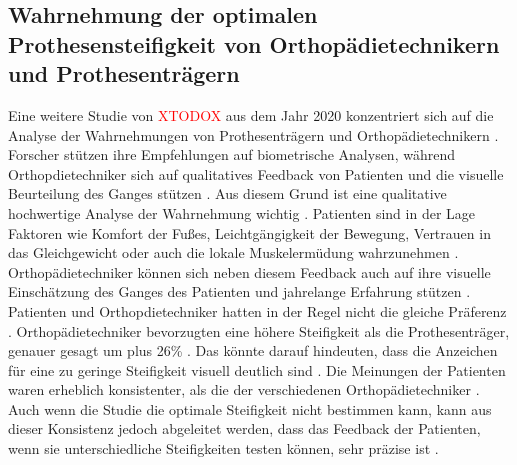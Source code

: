 \subsection{Wahrnehmung der optimalen Prothesensteifigkeit von Orthopädietechnikern und Prothesenträgern}
Eine weitere Studie von \textcolor{red}{XTODOX} aus dem Jahr 2020 konzentriert sich auf die Analyse der Wahrnehmungen von Prothesenträgern und Orthopädietechnikern \cite{Shepherd.2020}. Forscher stützen ihre Empfehlungen auf biometrische Analysen, während Orthopdietechniker sich auf qualitatives Feedback von Patienten und die visuelle Beurteilung des Ganges stützen \cite{Shepherd.2020}. Aus diesem Grund ist eine qualitative hochwertige Analyse der Wahrnehmung wichtig \cite{Shepherd.2020}. Patienten sind in der Lage Faktoren wie Komfort der Fußes, Leichtgängigkeit der Bewegung, Vertrauen in das Gleichgewicht oder auch die lokale Muskelermüdung wahrzunehmen \cite{Shepherd.2020}. Orthopädietechniker können sich neben diesem Feedback auch auf ihre visuelle Einschätzung des Ganges des Patienten und jahrelange Erfahrung stützen \cite{Shepherd.2020}. 
Patienten und Orthopdietechniker hatten in der Regel nicht die gleiche Präferenz \cite{Shepherd.2020}.  Orthopädietechniker bevorzugten eine höhere Steifigkeit als die Prothesenträger, genauer gesagt um plus 26\% \cite{Shepherd.2020}. Das könnte darauf hindeuten, dass die Anzeichen für eine zu geringe Steifigkeit visuell deutlich sind \cite{Shepherd.2020}. 
Die Meinungen der Patienten waren erheblich konsistenter, als die der verschiedenen Orthopädietechniker \cite{Shepherd.2020}. Auch wenn die Studie die optimale Steifigkeit nicht bestimmen kann, kann aus dieser Konsistenz jedoch abgeleitet werden, dass das Feedback der Patienten, wenn sie unterschiedliche Steifigkeiten testen können, sehr präzise ist \cite{Shepherd.2020}.

